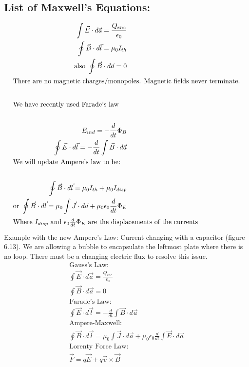     \subsection{List of Maxwell's Equations:}
    \begin{align*}
        \int\vec{E}\cdot d\vec{a}=\frac{Q_{enc}}{\epsilon_0}\\
        \oint\vec{B}\cdot d\vec{l}=\mu_0I_{th}\\
        \text{also }\oint\vec{B}\cdot d\vec{a}=0\\
        \shortintertext{There are no magnetic charges/monopoles. Magnetic fields never terminate.}\\
        \shortintertext{We have recently used Farade's law}\\
        E_{ind}=-\frac{d}{dt}\Phi_B\\
        \oint\vec{E}\cdot d\vec{l}=-\frac{d}{dt}\int\vec{B}\cdot d\vec{a}\\
        \shortintertext{We will update Ampere's law to be:}\\
        \oint\vec{B}\cdot d\vec{l}=\mu_0I_{th}+\mu_0I_{disp}\\
        \text{or }\oint\vec{B}\cdot d\vec{l}=\mu_0\int\vec{J}\cdot d\vec{a}+\mu_0\epsilon_0\frac{d}{dt}\Phi_E\\
        \shortintertext{Where $I_{disp}$ and $\epsilon_0\frac{d}{dt}\Phi_E$ are the displacements of the currents}
    \end{align*}
    Example with the new Ampere's Law:
    Current changing with a capacitor (figure 6.13). We are allowing a bubble to encapsulate the leftmost plate where there is no loop. There must be a changing electric flux to resolve this issue.
    \begin{align*}
        \text{Gauss's Law:}\\
        \oint\vec{E}\cdot d\vec{a}=\frac{Q_{enc}}{\epsilon_0}\\
        \oint\vec{B}\cdot d\vec{a}=0\\
        \text{Farade's Law:}\\
        \oint\vec{E}\cdot d\vec{l}=-\frac{d}{dt}\int\vec{B}\cdot d\vec{a}\\
        \text{Ampere-Maxwell:}\\
        \oint\vec{B}\cdot d\vec{l}=\mu_0\int\vec{J}\cdot d\vec{a}+\mu_0\epsilon_0\frac{d}{dt}\int\vec{E}\cdot d\vec{a}\\
        \text{Lorenty Force Law:}\\
        \vec{F}=q\vec{E}+q\vec{v}\times\vec{B}
    \end{align*}
